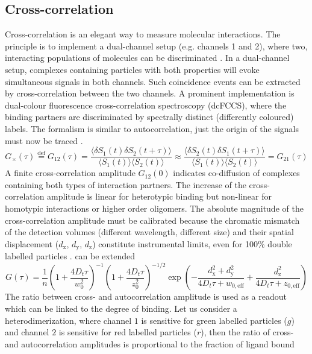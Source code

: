 \subsection{Cross-correlation}
\label{sec:theor.cross}
Cross-correlation is an elegant way to measure molecular interactions. The principle is to implement a dual-channel setup (e.g. channels 1 and 2), where two, interacting populations of molecules can be discriminated \cite{Foo2012,Ries2010,Schwille1997,Weidemann2002}. In a dual-channel setup, complexes containing particles with both properties will evoke simultaneous signals in both channels. Such coincidence events can be extracted by cross-correlation between the two channels. A prominent implementation is dual-colour fluorescence cross-correlation spectroscopy (dcFCCS), where the binding partners are discriminated by spectrally distinct (differently coloured) labels. The formalism is similar to autocorrelation, just the origin of the signals must now be traced \cite{Rippe2000,Weidemann2002,Schwille1997}.
	\begin{equation}
	\label{eq19}
	G_\times (\tau) \stackrel{\mathrm{def}}{=} G_{12} (\tau) = \frac{\langle \delta S_1(t) \delta S_2(t+\tau)\rangle}{\langle S_1(t) \rangle \langle S_2(t) \rangle} \approx \frac{\langle \delta S_2(t) \delta S_1(t+\tau)\rangle}{\langle S_1(t) \rangle \langle S_2(t) \rangle} =  G_{21} (\tau)
	\end{equation}
A finite cross-correlation amplitude $G_{12}(0)$ indicates co-diffusion of complexes containing both types of interaction partners. The increase of the cross-correlation amplitude is linear for heterotypic binding but non-linear for homotypic interactions or higher order oligomers. The absolute magnitude of the cross-correlation amplitude must be calibrated because the chromatic mismatch of the detection volumes (different wavelength, different size) and their spatial displacement ($d_\mathrm{x}$, $d_\mathrm{y}$, $d_\mathrm{z}$) constitute instrumental limits, even for 100\% double labelled particles \cite{Weidemann2002}.  can be extended
	\begin{equation}
	\label{eq20}
	G(\tau) = \frac{1}{n} \left(1+\frac{4 D_t \tau}{w_0^2} \right) ^{-1} \left(1+\frac{4D_t \tau}{z_0^2} \right)^{-1/2} \exp \left(- \frac{d_\mathrm{x}^2 + d_\mathrm{y}^2}{4 D_t \tau + w_{0,\mathrm{eff}}} + \frac{d_\mathrm{z}^2}{4 D_t \tau + z_{0,\mathrm{eff}}} \right)
	\end{equation}
The ratio between cross- and autocorrelation amplitude is used as a readout which can be linked to the degree of binding. Let us consider a heterodimerization, where channel $1$ is sensitive for green labelled particles ($g$) and channel $2$ is sensitive for red labelled particles ($r$), then the ratio of cross- and autocorrelation amplitudes is proportional to the fraction of ligand bound \cite{Weidemann2002}

